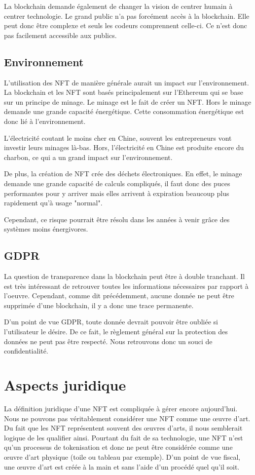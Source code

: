 \documentclass[11pt]{article}
\begin{document}
La blockchain demande également de changer la vision de centrer humain à centrer technologie. Le grand public n'a pas forcément accès à la blockchain. Elle peut donc être complexe et seuls les codeurs comprennent celle-ci. Ce n'est donc pas facilement accessible aux publics. 
\subsection{Environnement} %
L'utilisation des NFT de manière générale aurait un impact sur l'environnement. La blockchain et les NFT sont basés principalement sur l'Ethereum qui se base sur un principe de minage. Le minage est le fait de créer un NFT. Hors le minage demande une grande capacité énergétique. Cette consommation énergétique est donc lié à l'environnement. 

L'électricité coutant le moins cher en Chine, souvent les entrepreneurs vont investir leurs minages là-bas. Hors, l'électricité en Chine est produite encore du charbon, ce qui a un grand impact sur l'environnement. \cite{abdou_prospects_2021} 

De plus, la création de NFT crée des déchets électroniques. En effet, le minage demande une grande capacité de calculs compliqués, il faut donc des puces performantes pour y arriver mais elles arrivent à expiration beaucoup plus rapidement qu'à usage "normal".

Cependant, ce risque pourrait être résolu dans les années à venir grâce des systèmes moins énergivores. 

\subsection{GDPR} %
La question de transparence dans la blockchain peut être à double tranchant. Il est très intéressant de retrouver toutes les informations nécessaires par rapport à l'oeuvre. Cependant, comme dit précédemment, aucune donnée ne peut être supprimée d'une blockchain, il y a donc une trace permanente. 

D'un point de vue GDPR, toute donnée devrait pouvoir être oubliée si l'utilisateur le désire. De ce fait, le règlement général sur la protection des données ne peut pas être respecté. Nous retrouvons donc un souci de confidentialité.
\section{Aspects juridique} %
La définition juridique d'une NFT est compliquée à gérer encore aujourd'hui. Nous ne pouvons pas véritablement considérer une NFT comme une œuvre d'art.  Du fait que les NFT représentent souvent des œuvres d'arts, il nous semblerait logique de les qualifier ainsi. Pourtant du fait de sa technologie, une NFT n'est qu'un processus de tokenisation et donc ne peut être considérée comme une œuvre d'art physique (toile ou tableau par exemple). D'un point de vue fiscal, une œuvre d'art est créée à la main et sans l'aide d'un procédé quel qu'il soit. 
\end{document}
